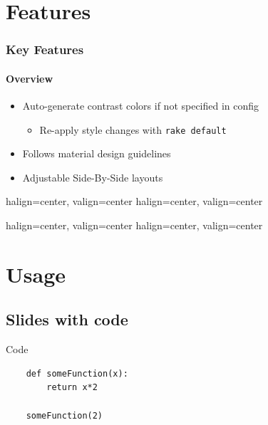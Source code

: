 \documentclass{beamer}
\begin{document}
\section{Features}
\begin{frame}
	\frametitle{Key Features}
	\framesubtitle{Overview}

	\begin{itemize}
		\item Auto-generate contrast colors if not specified in config
		\begin{itemize}
			\item Re-apply style changes with \texttt{rake default}
		\end{itemize}
		\item Follows material design guidelines
		\item Adjustable Side-By-Side layouts
	\end{itemize}
\end{frame}

\begin{frame}
	{halign=center, valign=center}
	{halign=center, valign=center}
\end{frame}

\begin{frame}
	{halign=center, valign=center}
	{halign=center, valign=center}
\end{frame}


\section{Usage}
\subsection{Slides with code}
\begin{frame}[fragile=singleslide]{Code}
	\begin{lstlisting}
	def someFunction(x):
		return x*2

	someFunction(2)
	\end{lstlisting}
\end{frame}
\end{document}
